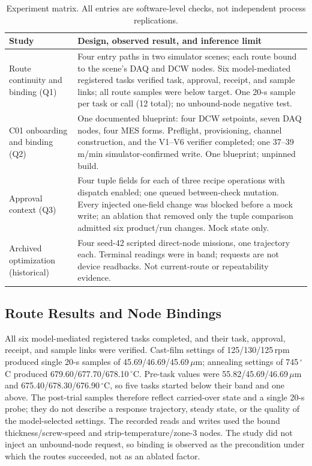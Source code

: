 \begin{table}[!t]
\centering
\caption{Experiment matrix. All entries are software-level checks, not
independent process replications.}
\label{tab:routes}
\footnotesize
\setlength{\tabcolsep}{3pt}
\begin{tabularx}{\columnwidth}{@{}>{\raggedright\arraybackslash}p{1.55cm}X@{}}
\toprule
Study & Design, observed result, and inference limit \\
\midrule
Route continuity and binding (Q1) &
Four entry paths in two simulator scenes; each route bound to the scene's DAQ
and DCW nodes. Six model-mediated registered tasks verified task, approval,
receipt, and sample links; all route samples were below target. One 20-s sample
per task or call (12 total); no unbound-node negative test. \\
C01 onboarding and binding (Q2) &
One documented blueprint: four DCW setpoints, seven DAQ nodes, four MES forms.
Preflight, provisioning, channel construction, and the V1--V6 verifier
completed; one 37--39\,m/min simulator-confirmed write. One blueprint;
unpinned build. \\
Approval context (Q3) &
Four tuple fields for each of three recipe operations with dispatch enabled;
one queued between-check mutation. Every injected one-field change was blocked
before a mock write; an ablation that removed only the tuple comparison admitted
six product/run changes. Mock state only. \\
Archived optimization (historical) &
Four seed-42 scripted direct-node missions, one trajectory each. Terminal
readings were in band; requests are not device readbacks. Not current-route or
repeatability evidence. \\
\bottomrule
\end{tabularx}
\end{table}

\subsection{Route Results and Node Bindings}
\label{sec:testbed}
All six model-mediated registered tasks completed, and their task, approval,
receipt, and sample links were verified. Cast-film settings of
125/130/125\,rpm produced single 20-s samples of
45.69/46.69/45.69\,$\mu$m; annealing settings of 745\,$^{\circ}$C produced
679.60/677.70/678.10\,$^{\circ}$C. Pre-task values were
55.82/45.69/46.69\,$\mu$m and 675.40/678.30/676.90\,$^{\circ}$C, so five tasks
started below their band and one above. The post-trial samples therefore
reflect carried-over state and a single 20-s probe; they do not describe a
response trajectory, steady state, or the quality of the model-selected
settings. The recorded reads and writes used the bound thickness/screw-speed
and strip-temperature/zone-3 nodes. The study did not inject an unbound-node
request, so binding is observed as the precondition under which the routes
succeeded, not as an ablated factor.

